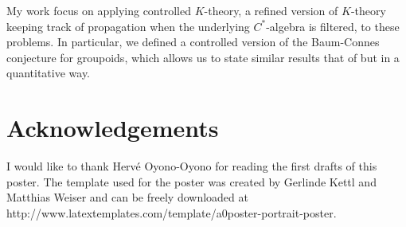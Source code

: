 \documentclass[a0,portrait]{a0poster}
\begin{document}
\begin{multicols}{2}
My work focus on applying controlled $K$-theory, a refined version of $K$-theory keeping track of propagation when the underlying $C^*$-algebra is filtered, to these problems. In particular, we defined a controlled version of the Baum-Connes conjecture for groupoids, which allows us to state similar results that of \cite{finn} but in a quantitative way. \\

\color{DarkSlateGray} %



\nocite{*} %


\section*{Acknowledgements}

I would like to thank Herv\'e Oyono-Oyono for reading the first drafts of this poster. 
The template used for the poster was created by Gerlinde Kettl and Matthias Weiser and can be freely downloaded at
http://www.latextemplates.com/template/a0poster-portrait-poster.


\end{multicols}
\end{document}
